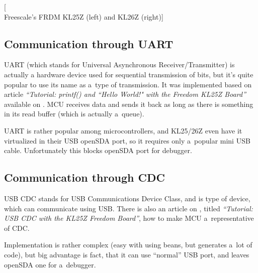 [\\Freescale's FRDM KL25Z (left) and KL26Z (right)]

\subsection{Communication through UART}
UART (which stands for Universal Asynchronous Receiver/Transmitter) is actually
a hardware device used for sequential transmission of bits, but it's quite
popular to use its name as a~type of transmission.
It was implemented based on article 
\emph{``Tutorial: printf() and ``Hello World!" with the Freedom KL25Z Board''}
available on \cite{mcu_on_eclipse}.
MCU receives data and sends it back as long as there is something in its read
buffer (which is actually a~queue).

UART is rather popular among microcontrollers, and KL25/26Z even have it
virtualized in their USB openSDA port, so it requires only a~popular mini USB
cable. 
Unfortunately this blocks openSDA port for debugger.

\subsection{Communication through CDC}
USB CDC stands for USB Communications Device Class, and is type of device, which
can communicate using USB.
There is also an article on \cite{mcu_on_eclipse}, titled
\emph{``Tutorial: USB CDC with the KL25Z Freedom Board''},
how to make MCU a~representative of CDC.

Implementation is rather complex (easy with using beans, but generates a~lot of
code), but big advantage is fact, that it can use ``normal'' USB port, and
leaves openSDA one for a~debugger.
